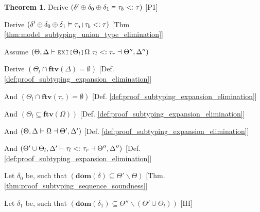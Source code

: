 \documentclass[acmsmall]{acmart}
\theoremstyle{definition}
\newtheorem{theorem}{Theorem}[section]
\begin{document}
\begin{theorem}
  \item \I\I \N Derive $(
    \delta' \oplus \delta_0 \oplus \delta_1 \vDash \tau_b <: \tau
  )$ [P1]

  \item \I\I \N Derive $(
    \delta' \oplus \delta_0 \oplus \delta_1 \satisfies \tau_a \J{|} \tau_b \subtypes \tau
  )$ [Thm \ref{thm:model_subtyping_union_type_elimination}]



  \item \N Assume $(
    \Theta, \Delta \entails
    \J{EXI[}\Theta_l\J{]}\Omega\ \tau_l \subtypes \tau_r
    \given \Theta'', \Delta'' 
  )$

  \item \I \N Derive $(
    \Theta_l \cap \textbf{ftv}(\Delta) = \emptyset 
  )$ [Def. \ref{def:proof_subtyping_expansion_elimination}]
  \item \I \N And $(
    \Theta_l \cap \textbf{ftv}(\tau_r) = \emptyset
  )$ [Def. \ref{def:proof_subtyping_expansion_elimination}]
  \item \I \N And $(
    \Theta_l \subseteq \textbf{ftv}(\Omega)
  )$ [Def. \ref{def:proof_subtyping_expansion_elimination}]
  \item \I \N And $(
    \Theta, \Delta \vdash \Omega \dashv \Theta', \Delta'
  )$ [Def. \ref{def:proof_subtyping_expansion_elimination}]
  \item \I \N And $(
    \Theta' \cup \Theta_l, \Delta' \vdash
    \tau_l <: \tau_r \dashv \Theta'', \Delta''
  )$ [Def. \ref{def:proof_subtyping_expansion_elimination}]





  \item \I \N Let $\delta_0$ be, such that $(
    \textbf{dom}(\delta) \subseteq \Theta' \backslash \Theta
  )$ [Thm. \ref{thm:proof_subtyping_sequence_soundness}]

  

  \item \I \N Let $\delta_1$ be, such that $(
    \textbf{dom}(\delta_1) \subseteq \Theta'' \backslash (\Theta' \cup \Theta_l)
  )$ [IH]



\end{theorem}
\end{document}
